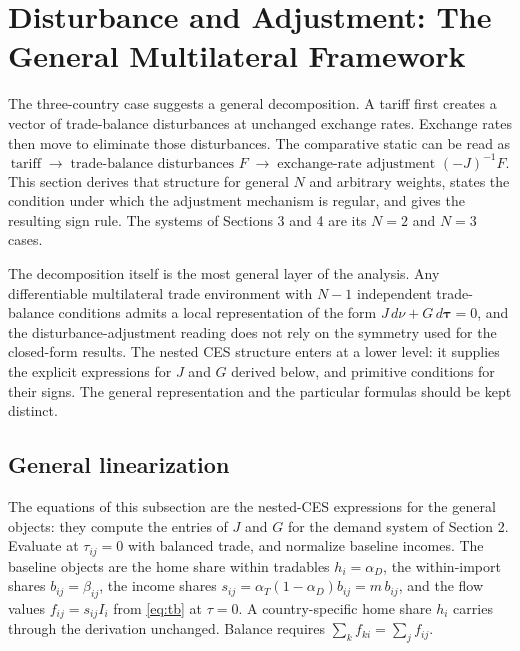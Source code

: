 \documentclass[11pt]{article}
\begin{document}
\section{Disturbance and Adjustment: The General Multilateral Framework}

The three-country case suggests a general decomposition. A tariff first creates a vector of trade-balance disturbances at unchanged exchange rates. Exchange rates then move to eliminate those disturbances. The comparative static can be read as
\[
\text{tariff}
\;\longrightarrow\;
\text{trade-balance disturbances } F
\;\longrightarrow\;
\text{exchange-rate adjustment } (-J)^{-1}F .
\]
This section derives that structure for general $N$ and arbitrary weights, states the condition under which the adjustment mechanism is regular, and gives the resulting sign rule. The systems of Sections 3 and 4 are its $N = 2$ and $N = 3$ cases.

The decomposition itself is the most general layer of the analysis. Any differentiable multilateral trade environment with $N-1$ independent trade-balance conditions admits a local representation of the form $J\, d\nu + G\, d\boldsymbol{\tau} = 0$, and the disturbance-adjustment reading does not rely on the symmetry used for the closed-form results. The nested CES structure enters at a lower level: it supplies the explicit expressions for $J$ and $G$ derived below, and primitive conditions for their signs. The general representation and the particular formulas should be kept distinct.

\subsection{General linearization}

The equations of this subsection are the nested-CES expressions for the general objects: they compute the entries of $J$ and $G$ for the demand system of Section 2. Evaluate at $\tau_{ij} = 0$ with balanced trade, and normalize baseline incomes. The baseline objects are the home share within tradables $h_i = \alpha_D$, the within-import shares $b_{ij} = \beta_{ij}$, the income shares $s_{ij} = \alpha_T(1-\alpha_D) b_{ij} = m\, b_{ij}$, and the flow values $f_{ij} = s_{ij} I_i$ from \eqref{eq:tb} at $\tau = 0$. A country-specific home share $h_i$ carries through the derivation unchanged. Balance requires $\sum_k f_{ki} = \sum_j f_{ij}$.
\end{document}
